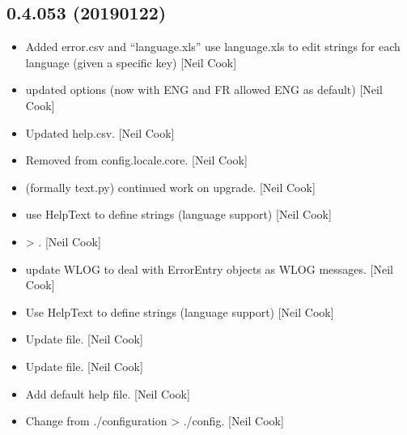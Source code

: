\documentclass[a4paper,10pt,english]{report}
\begin{document}
\subsection{0.4.053 (2019\sphinxhyphen{}01\sphinxhyphen{}22)}
\label{\detokenize{misc/changelog:id230}}\begin{itemize}
\item {} 
Added error.csv and “language.xls” \sphinxhyphen{} use language.xls to edit strings
for each language (given a specific key) {[}Neil Cook{]}

\item {} 
 \sphinxhyphen{} updated options (now with ENG and FR allowed \sphinxhyphen{} ENG
as default) {[}Neil Cook{]}

\item {} 
Updated help.csv. {[}Neil Cook{]}

\item {} 
Removed  from config.locale.core. {[}Neil Cook{]}

\item {} 
 \sphinxhyphen{} (formally text.py) \sphinxhyphen{} continued work on upgrade. {[}Neil
Cook{]}

\item {} 
 \sphinxhyphen{} use HelpText to define strings (language
support) {[}Neil Cook{]}

\item {} 
 \sphinxhyphen{}  \textendash{}\textgreater{} . {[}Neil Cook{]}

\item {} 
 \sphinxhyphen{} update WLOG to deal with ErrorEntry objects as WLOG
messages. {[}Neil Cook{]}

\item {} 
Use HelpText to define strings (language support) {[}Neil Cook{]}

\item {} 
Update  file. {[}Neil Cook{]}

\item {} 
Update  file. {[}Neil Cook{]}

\item {} 
Add default help file. {[}Neil Cook{]}

\item {} 
Change from ./configuration \textendash{}\textgreater{} ./config. {[}Neil Cook{]}


\end{itemize}
\end{document}
